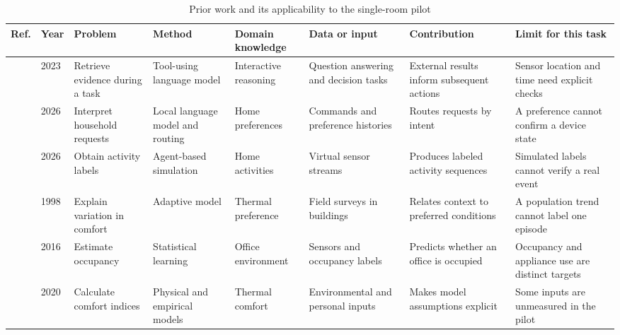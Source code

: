 \begin{table}[t]
\caption{Prior work and its applicability to the single-room pilot}
\label{tab:work}\centering\footnotesize
\setlength{\tabcolsep}{3pt}
\begin{tabularx}{\textwidth}{@{}l l Y Y Y Y Y Y@{}}
\toprule
Ref. & Year & Problem & Method & Domain knowledge & Data or input & Contribution & Limit for this task\\
\midrule
\cite{react} & 2023 & Retrieve evidence during a task & Tool-using language model & Interactive reasoning & Question answering and decision tasks & External results inform subsequent actions & Sensor location and time need explicit checks\\
\cite{adahome} & 2026 & Interpret household requests & Local language model and routing & Home preferences & Commands and preference histories & Routes requests by intent & A preference cannot confirm a device state\\
\cite{agentsense} & 2026 & Obtain activity labels & Agent-based simulation & Home activities & Virtual sensor streams & Produces labeled activity sequences & Simulated labels cannot verify a real event\\
\cite{deDear} & 1998 & Explain variation in comfort & Adaptive model & Thermal preference & Field surveys in buildings & Relates context to preferred conditions & A population trend cannot label one episode\\
\cite{occupancy} & 2016 & Estimate occupancy & Statistical learning & Office environment & Sensors and occupancy labels & Predicts whether an office is occupied & Occupancy and appliance use are distinct targets\\
\cite{cbe} & 2020 & Calculate comfort indices & Physical and empirical models & Thermal comfort & Environmental and personal inputs & Makes model assumptions explicit & Some inputs are unmeasured in the pilot\\
\bottomrule
\end{tabularx}
\end{table}
